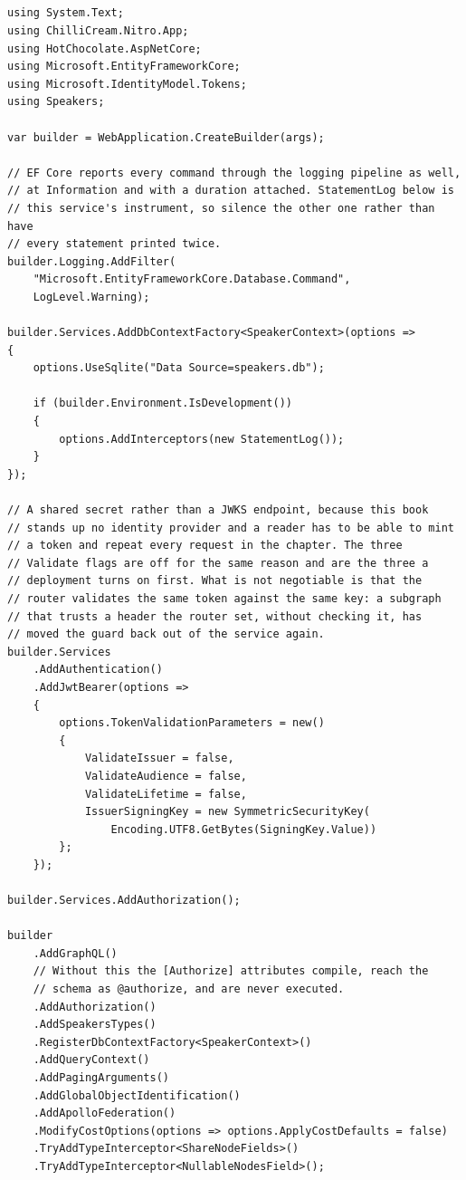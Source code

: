 \subsection*{}
\begin{verbatim}
using System.Text;
using ChilliCream.Nitro.App;
using HotChocolate.AspNetCore;
using Microsoft.EntityFrameworkCore;
using Microsoft.IdentityModel.Tokens;
using Speakers;

var builder = WebApplication.CreateBuilder(args);

// EF Core reports every command through the logging pipeline as well,
// at Information and with a duration attached. StatementLog below is
// this service's instrument, so silence the other one rather than have
// every statement printed twice.
builder.Logging.AddFilter(
    "Microsoft.EntityFrameworkCore.Database.Command",
    LogLevel.Warning);

builder.Services.AddDbContextFactory<SpeakerContext>(options =>
{
    options.UseSqlite("Data Source=speakers.db");

    if (builder.Environment.IsDevelopment())
    {
        options.AddInterceptors(new StatementLog());
    }
});

// A shared secret rather than a JWKS endpoint, because this book
// stands up no identity provider and a reader has to be able to mint
// a token and repeat every request in the chapter. The three
// Validate flags are off for the same reason and are the three a
// deployment turns on first. What is not negotiable is that the
// router validates the same token against the same key: a subgraph
// that trusts a header the router set, without checking it, has
// moved the guard back out of the service again.
builder.Services
    .AddAuthentication()
    .AddJwtBearer(options =>
    {
        options.TokenValidationParameters = new()
        {
            ValidateIssuer = false,
            ValidateAudience = false,
            ValidateLifetime = false,
            IssuerSigningKey = new SymmetricSecurityKey(
                Encoding.UTF8.GetBytes(SigningKey.Value))
        };
    });

builder.Services.AddAuthorization();

builder
    .AddGraphQL()
    // Without this the [Authorize] attributes compile, reach the
    // schema as @authorize, and are never executed.
    .AddAuthorization()
    .AddSpeakersTypes()
    .RegisterDbContextFactory<SpeakerContext>()
    .AddQueryContext()
    .AddPagingArguments()
    .AddGlobalObjectIdentification()
    .AddApolloFederation()
    .ModifyCostOptions(options => options.ApplyCostDefaults = false)
    .TryAddTypeInterceptor<ShareNodeFields>()
    .TryAddTypeInterceptor<NullableNodesField>();


\end{verbatim}
